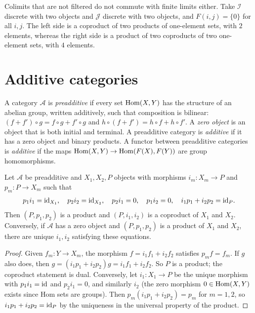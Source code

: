 \begin{counterexample}\label{categories:counterexample-colimits-limits}
Colimits that are not filtered do not commute with finite limits either. Take
$\mathcal{I}$ discrete with two objects and $\mathcal{J}$ discrete with two objects,
and $F(i, j) = \{0\}$ for all $i, j$. The left side is a coproduct of two products of
one-element sets, with $2$ elements, whereas the right side is a product of two
coproducts of two one-element sets, with $4$ elements.
\end{counterexample}

\section{Additive categories}\label{categories:section-additive}

\begin{definition}\label{categories:definition-additive}
A category $\mathcal{A}$ is \emph{preadditive} if every set $\operatorname{Hom}(X, Y)$ has the
structure of an abelian group, written additively, such that composition is
bilinear: $(f + f') \circ g = f \circ g + f' \circ g$ and
$h \circ (f + f') = h \circ f + h \circ f'$. A \emph{zero object} is an object that is both
initial and terminal. A preadditive category is \emph{additive} if it has a zero
object and binary products. A functor between preadditive categories is
\emph{additive} if the maps $\operatorname{Hom}(X, Y) \to \operatorname{Hom}(F(X), F(Y))$ are group
homomorphisms.
\end{definition}

\begin{lemma}\label{categories:lemma-biproducts}
Let $\mathcal{A}$ be preadditive and $X_1, X_2, P$ objects with morphisms
$i_m \colon X_m \to P$ and $p_m \colon P \to X_m$ such that
\[
p_1 i_1 = \mathrm{id}_{X_1}, \quad p_2 i_2 = \mathrm{id}_{X_2}, \quad p_2 i_1 = 0, \quad p_1 i_2 = 0, \quad
i_1 p_1 + i_2 p_2 = \mathrm{id}_P.
\]
Then $(P, p_1, p_2)$ is a product and $(P, i_1, i_2)$ is a coproduct of $X_1$ and
$X_2$. Conversely, if $\mathcal{A}$ has a zero object and $(P, p_1, p_2)$ is a
product of $X_1$ and $X_2$, there are unique $i_1, i_2$ satisfying these equations.
\end{lemma}

\begin{proof}
Given $f_m \colon Y \to X_m$, the morphism $f = i_1 f_1 + i_2 f_2$ satisfies $p_m f = f_m$.
If $g$ also does, then $g = (i_1 p_1 + i_2 p_2) g = i_1 f_1 + i_2 f_2$. So $P$ is a product;
the coproduct statement is dual. Conversely, let $i_1 \colon X_1 \to P$ be the unique
morphism with $p_1 i_1 = \mathrm{id}$ and $p_2 i_1 = 0$, and similarly $i_2$ (the zero morphism
$0 \in \operatorname{Hom}(X, Y)$ exists since Hom sets are groups). Then
$p_m (i_1 p_1 + i_2 p_2) = p_m$ for $m = 1, 2$, so $i_1 p_1 + i_2 p_2 = \mathrm{id}_P$ by the
uniqueness in the universal property of the product.
\end{proof}

